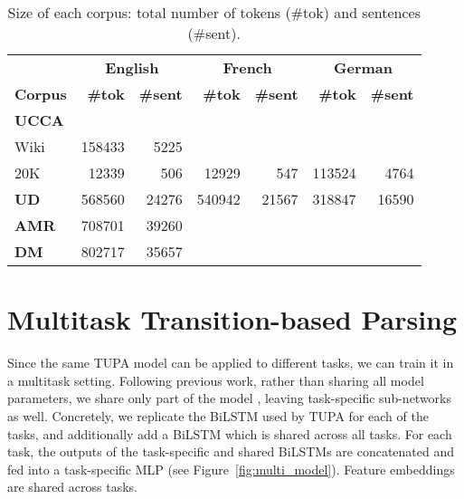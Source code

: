 \documentclass[11pt,a4paper]{article}
\begin{document}
\begin{table}[ht]
\centering
\small
\setlength\tabcolsep{3pt}
\begin{tabular}{l|rr|rr|rr}
& \multicolumn{2}{c|}{\footnotesize \bf English} & \multicolumn{2}{c|}{\footnotesize \bf French} & \multicolumn{2}{c}{\footnotesize \bf German} \\
\footnotesize \bf Corpus & \footnotesize \bf {\#}tok & \footnotesize \bf {\#}sent & \footnotesize \bf {\#}tok & \footnotesize \bf {\#}sent & \footnotesize \bf {\#}tok & \footnotesize \bf {\#}sent \\
\hline
\textbf{UCCA} &&&& \\
Wiki & 158433 & 5225 &&&& \\
20K & 12339 & 506 & 12929 & 547 & 113524 & 4764 \\
\hline
\textbf{UD} & 568560 & 24276 & 540942 & 21567 & 318847 & 16590 \\
\hline
\textbf{AMR} & 708701 & 39260 \\
\hline
\textbf{DM} & 802717 & 35657 \\
\end{tabular}
\caption{Size of each corpus: total number of tokens ({\#}tok) and sentences ({\#}sent).
\label{tab:corpora}}
\end{table}


\section{Multitask Transition-based Parsing}\label{sec:multitask}

Since the same TUPA model can be applied to different tasks, 
we can train it in a multitask setting.
Following previous work, rather than sharing all model parameters, we share only part of the model
\cite{N16-1179,P16-2038,C16-1013,C16-1059,C16-1179,E17-1005,P17-1186}, leaving task-specific
sub-networks as well.
Concretely, we replicate the BiLSTM used by TUPA for each of the tasks, and additionally add
a BiLSTM which is shared across all tasks. 
For each task, the outputs of the task-specific and shared BiLSTMs are concatenated and
fed into a task-specific MLP (see Figure~\ref{fig:multi_model}).
Feature embeddings are shared across tasks.
\end{document}
